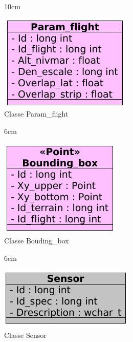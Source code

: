 \begin{figure}[!ht]{10cm}
  \caption{Classe Param\_flight} \label{parm_flight}
  \centering
  \includegraphics[width=0.5\hsize]{figuras/35.png}
\end{figure}

\begin{figure}[!ht]{6cm}
  \caption{Classe Bouding\_box} \label{bbox}
  \centering
  \includegraphics[width=0.7\hsize]{figuras/36.png}
\end{figure}

\begin{figure}[!ht]{6cm}
  \caption{Classe Sensor} \label{sensor}
  \centering
  \includegraphics[width=0.8\hsize]{figuras/41.png}
\end{figure}

